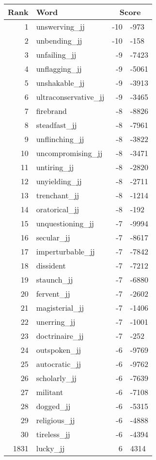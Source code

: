 \begin{longtable}[!htbp]{| rlr@{.}l |}
    \hline
    \textbf{Rank} & \textbf{Word} & \multicolumn{2}{c|}{\textbf{Score}} \\
    \hline
    \endhead
    1 & unswerving\_jj & -10 & -973 \\
    2 & unbending\_jj & -10 & -158 \\
    3 & unfailing\_jj & -9 & -7423 \\
    4 & unflagging\_jj & -9 & -5061 \\
    5 & unshakable\_jj & -9 & -3913 \\
    6 & ultraconservative\_jj & -9 & -3465 \\
    7 & firebrand & -8 & -8826 \\
    8 & steadfast\_jj & -8 & -7961 \\
    9 & unflinching\_jj & -8 & -3822 \\
    10 & uncompromising\_jj & -8 & -3471 \\
    11 & untiring\_jj & -8 & -2820 \\
    12 & unyielding\_jj & -8 & -2711 \\
    13 & trenchant\_jj & -8 & -1214 \\
    14 & oratorical\_jj & -8 & -192 \\
    15 & unquestioning\_jj & -7 & -9994 \\
    16 & secular\_jj & -7 & -8617 \\
    17 & imperturbable\_jj & -7 & -7842 \\
    18 & dissident & -7 & -7212 \\
    19 & staunch\_jj & -7 & -6880 \\
    20 & fervent\_jj & -7 & -2602 \\
    21 & magisterial\_jj & -7 & -1406 \\
    22 & unerring\_jj & -7 & -1001 \\
    23 & doctrinaire\_jj & -7 & -252 \\
    24 & outspoken\_jj & -6 & -9769 \\
    25 & autocratic\_jj & -6 & -9762 \\
    26 & scholarly\_jj & -6 & -7639 \\
    27 & militant & -6 & -7108 \\
    28 & dogged\_jj & -6 & -5315 \\
    29 & religious\_jj & -6 & -4888 \\
    30 & tireless\_jj & -6 & -4394 \\
    1831 & lucky\_jj & 6 & 4314 \\

\end{longtable}
